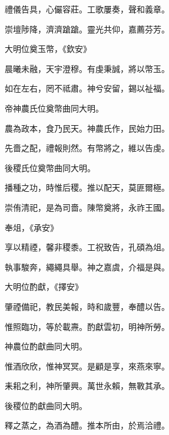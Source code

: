 \begin{pinyinscope}
 禮儀告具，心儼容莊。工歌屢奏，聲和義章。



 崇壇陟降，濟濟蹌蹌。靈光共仰，嘉薦芬芳。



 大明位奠玉幣，《欽安》



 晨曦未融，天宇澄穆。有虔秉誠，將以幣玉。



 如在左右，罔不祗肅。神兮安留，錫以祉福。



 帝神農氏位奠幣曲同大明。



 農為政本，食乃民天。神農氏作，民始力田。



 先嗇之配，禮報則然。有幣將之，維以告虔。



 後稷氏位奠幣曲同大明。



 播種之功，時惟后稷。推以配天，莫匪爾極。



 崇侑清祀，是為司嗇。陳幣奠將，永祚王國。



 奉俎，《承安》



 享以精禋，馨非稷黍。工祝致告，孔碩為俎。



 執事駿奔，繩繩具舉。神之嘉虞，介福是與。



 大明位酌獻，《擇安》



 肇禋備祀，教民美報，時和歲豐，奉醴以告。



 惟照臨功，等於載燾。酌獻雲初，明神所勞。



 神農位酌獻曲同大明。



 惟酒欣欣，惟神冥冥。是顧是享，來燕來寧。



 耒耜之利，神所肇興。萬世永賴，無斁其承。



 後稷位酌獻曲同大明。



 釋之蒸之，為酒為醴。推本所由，於焉洽禮。




\end{pinyinscope}
